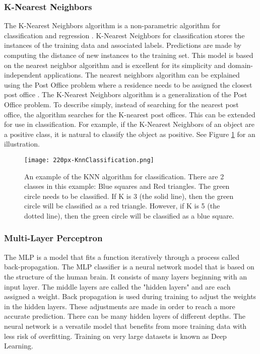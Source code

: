 \subsubsection{K-Nearest Neighbors}
The K-Nearest Neighbors algorithm is a non-parametric algorithm for classification and regression \cite{altman1992introduction}.
K-Nearest Neighbors for classification stores the instances of the training data and associated labels.
Predictions are made by computing the distance of new instances to the training set.
This model is based on the nearest neighbor algorithm and is excellent for its simplicity and domain-independent applications.
The nearest neighbors algorithm can be explained using the Post Office problem where a residence needs to be assigned the closest post office \cite{knuth1997art}.
The K-Nearest Neighbors algorithm is a generalization of the Post Office problem.
To describe simply, instead of searching for the nearest post office, the algorithm searches for the K-nearest post offices.
This can be extended for use in classification.
For example, if the K-Nearest Neighbors of an object are a positive class, it is natural to classify the object as positive.
See Figure \ref{fig:knn} for an illustration.

\begin{figure}[htp]
    \centering
    \texttt{[image: 220px-KnnClassification.png]}
    \caption[Figure depicting the K Nearest Neighbors algorithm]{An example of the KNN algorithm for classification.
    There are 2 classes in this example: Blue squares and Red triangles.
    The green circle needs to be classified.
    If K is 3 (the solid line), then the green circle will be classified as a red triangle.
    However, if K is 5 (the dotted line), then the green circle will be classified as a blue square.}
    \label{fig:knn}
\end{figure} 

\medskip

\subsubsection{Multi-Layer Perceptron}
The \ac{MLP} is a model that fits a function iteratively through a process called back-propagation.
The MLP classifier is a neural network model that is based on the structure of the human brain.
It consists of many layers beginning with an input layer.
The middle layers are called the "hidden layers" and are each assigned a weight.
Back propagation is used during training to adjust the weights in the hidden layers.
These adjustments are made in order to reach a more accurate prediction.
There can be many hidden layers of different depths.
The neural network is a versatile model that benefits from more training data with less risk of overfitting.
Training on very large datasets is known as Deep Learning.

